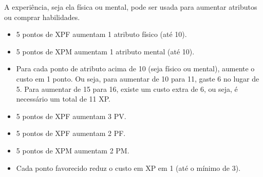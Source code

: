 A experiência, seja ela física ou mental, pode ser usada para aumentar atributos ou comprar habilidades. 

\begin{itemize}
\item 5 pontos de XPF aumentam 1 atributo físico (até 10).
\item 5 pontos de XPM aumentam 1 atributo mental (até 10).
\item Para cada ponto de atributo acima de 10 (seja físico ou mental), aumente o custo em 1 ponto. Ou seja, para aumentar de 10 para 11, gaste 6 no lugar de 5. Para aumentar de 15 para 16, existe um custo extra de 6, ou seja, é necessário um total de 11 XP.
\item 5 pontos de XPF aumentam 3 PV.
\item 5 pontos de XPF aumentam 2 PF.
\item 5 pontos de XPM aumentam 2 PM.
\item Cada ponto favorecido reduz o custo em XP em 1 (até o mínimo de 3).
\end{itemize}




